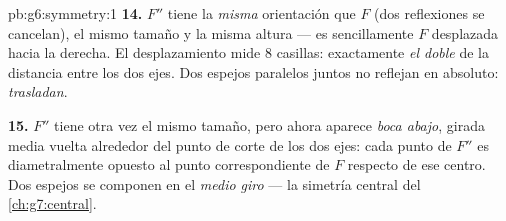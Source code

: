 \begin{solution}{pb:g6:symmetry:1}
\textbf{14.} $F''$ tiene la \emph{misma} orientación que $F$ (dos
reflexiones se cancelan), el mismo tamaño y la misma
altura --- es sencillamente $F$ desplazada hacia la derecha. El desplazamiento
mide $8$ casillas: exactamente \emph{el doble} de la distancia entre
los dos ejes. Dos espejos paralelos juntos no reflejan en
absoluto: \emph{trasladan}.

\textbf{15.} $F''$ tiene otra vez el mismo tamaño, pero ahora aparece
\emph{boca abajo}, girada media vuelta alrededor del punto de corte
de los dos ejes: cada punto de $F''$ es diametralmente
opuesto al punto correspondiente de $F$ respecto de ese centro.
Dos espejos  se componen en el \emph{medio giro} ---
la simetría central del \cref{ch:g7:central}.
\end{solution}
